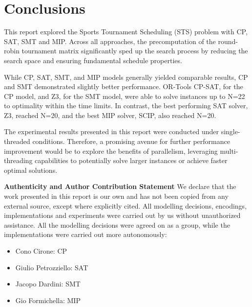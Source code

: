\section{Conclusions}
This report explored the Sports Tournament Scheduling (STS) problem with CP, SAT, SMT and MIP. Across all approaches, the precomputation of the round-robin tournament matrix significantly sped up the search process by reducing the search space and ensuring fundamental schedule properties.

While CP, SAT, SMT, and MIP models generally yielded comparable results, CP and SMT demonstrated slightly better performance. OR-Tools CP-SAT, for the  CP model, and Z3, for the SMT model, were able to solve instances up to N=22 to optimality within the time limits. In contrast, the best performing SAT solver, Z3, reached N=20, and the best MIP solver, SCIP, also reached N=20.

The experimental results presented in this report were conducted under single-threaded conditions. Therefore, a promising avenue for further performance improvement would be to explore the benefits of parallelism, leveraging multi-threading capabilities to potentially solve larger instances or achieve faster optimal solutions.

\noindent\textbf{Authenticity and Author Contribution Statement}
We declare that the work presented in this report is our own and has not been copied from any external source, except where explicitly cited. All modelling decisions, encodings, implementations and experiments were carried out by us without unauthorized assistance.
All the modelling decisions were agreed on as a group, while the implementations were carried out more autonomously:
\begin{itemize}
    \item Cono Cirone: CP
    \item Giulio Petrozziello: SAT
    \item Jacopo Dardini: SMT
    \item Gio Formichella: MIP
\end{itemize}